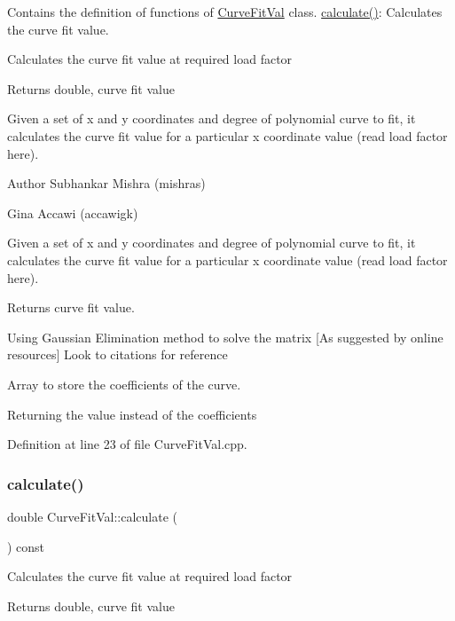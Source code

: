 Contains the definition of functions of \hyperlink{class_curve_fit_val}{Curve\+Fit\+Val} class. \hyperlink{class_curve_fit_val_af928003c67aed9c644632a548be08713}{calculate()}\+: Calculates the curve fit value. 

Calculates the curve fit value at required load factor \begin{DoxyReturn}{Returns}
double, curve fit value
\end{DoxyReturn}
Given a set of x and y coordinates and degree of polynomial curve to fit, it calculates the curve fit value for a particular x coordinate value (read load factor here).

\begin{DoxyAuthor}{Author}
Subhankar Mishra (mishras) 

Gina Accawi (accawigk) 
\end{DoxyAuthor}
Given a set of x and y coordinates and degree of polynomial curve to fit, it calculates the curve fit value for a particular x coordinate value (read load factor here). \begin{DoxyReturn}{Returns}
curve fit value. 
\end{DoxyReturn}
Using Gaussian Elimination method to solve the matrix \mbox{[}As suggested by online resources\mbox{]} Look to citations for reference

Array to store the coefficients of the curve.

Returning the value instead of the coefficients

Definition at line 23 of file Curve\+Fit\+Val.\+cpp.

\mbox{\label{class_curve_fit_val_af928003c67aed9c644632a548be08713}} 
\subsubsection{\texorpdfstring{calculate()}{calculate()}\hspace{0.1cm}{\footnotesize\ttfamily [2/3]}}
{\footnotesize\ttfamily double Curve\+Fit\+Val\+::calculate (\begin{DoxyParamCaption}{ }\end{DoxyParamCaption}) const}

Calculates the curve fit value at required load factor \begin{DoxyReturn}{Returns}
double, curve fit value 
\end{DoxyReturn}
\mbox{\label{class_curve_fit_val_af928003c67aed9c644632a548be08713}} 
